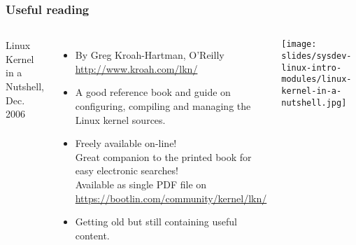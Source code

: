 \begin{frame}
  \frametitle{Useful reading}
  \begin{columns}
    Linux Kernel in a Nutshell, Dec. 2006
    \begin{itemize}
    \item By Greg Kroah-Hartman, O'Reilly\\
      \url{http://www.kroah.com/lkn/}
    \item A good reference book and guide on configuring, compiling
      and managing the Linux kernel sources.
    \item Freely available on-line!\\
      Great companion to the printed book for easy electronic searches!\\
      Available as single PDF file on
      \url{https://bootlin.com/community/kernel/lkn/}
    \item Getting old but still containing useful content.
    \end{itemize}
    \texttt{[image: slides/sysdev-linux-intro-modules/linux-kernel-in-a-nutshell.jpg]}
  \end{columns}
\end{frame}
